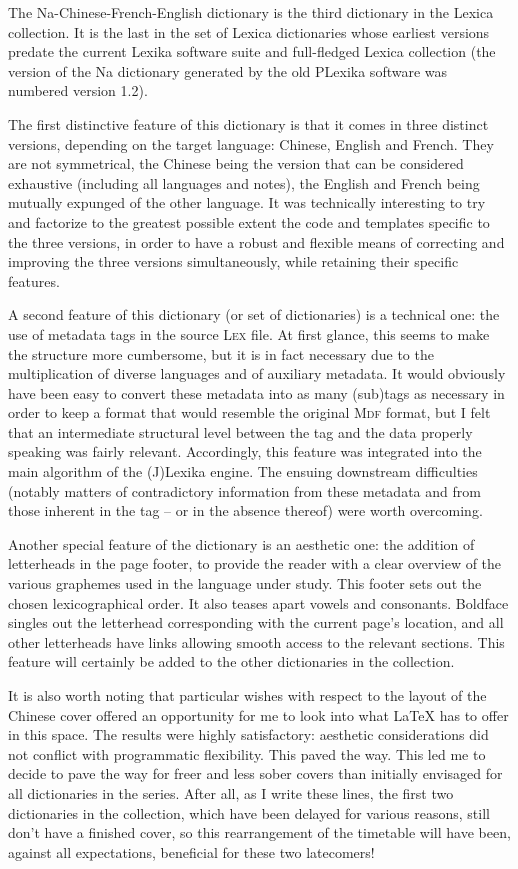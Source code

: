 The Na-Chinese-French-English dictionary is the third dictionary in the Lexica collection. It is the last in the set of Lexica dictionaries whose earliest versions predate the current Lexika software suite and full-fledged Lexica collection (the version of the Na dictionary generated by the old PLexika software was numbered version 1.2).

The first distinctive feature of this dictionary is that it comes in three distinct versions, depending on the target language: Chinese, English and French. They are not symmetrical, the Chinese being the version that can be considered exhaustive (including all languages and notes), the English and French being mutually expunged of the other language. It was technically interesting to try and factorize to the greatest possible extent the code and templates specific to the three versions, in order to have a robust and flexible means of correcting and improving the three versions simultaneously, while retaining their specific features.

A second feature of this dictionary (or set of dictionaries) is a technical one: the use of metadata tags in the source \textsc{Lex} file. At first glance, this seems to make the structure more cumbersome, but it is in fact necessary due to the multiplication of diverse languages and of auxiliary metadata. It would obviously have been easy to convert these metadata into as many (sub)tags as necessary in order to keep a format that would resemble the original \textsc{Mdf} format, but I felt that an intermediate structural level between the tag and the data properly speaking was fairly relevant. Accordingly, this feature was integrated into the main algorithm of the (J)Lexika engine. The ensuing downstream difficulties (notably matters of contradictory information from these metadata and from those inherent in the tag – or in the absence thereof) were worth overcoming.

Another special feature of the dictionary is an aesthetic one: the addition of letterheads in the page footer, to provide the reader with a clear overview of the various graphemes used in the language under study. This footer sets out the chosen lexicographical order. It also teases apart vowels and consonants. Boldface singles out the letterhead corresponding with the current page's location, and all other letterheads have links allowing smooth access to the relevant sections. This feature will certainly be added to the other dictionaries in the collection.

It is also worth noting that particular wishes with respect to the layout of the Chinese cover offered an opportunity for me to look into what \LaTeX{} has to offer in this space. The results were highly satisfactory: aesthetic considerations did not conflict with programmatic flexibility. This paved the way. This led me to decide to pave the way for freer and less sober covers than initially envisaged for all dictionaries in the series. After all, as I write these lines, the first two dictionaries in the collection, which have been delayed for various reasons, still don't have a finished cover, so this rearrangement of the timetable will have been, against all expectations, beneficial for these two latecomers!

